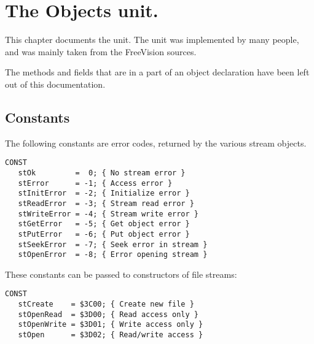 %
%
%
%
%
\chapter{The Objects unit.}
This chapter documents the  unit. The unit was implemented by
many people, and was mainly taken from the FreeVision sources.

The methods and fields that are in a  part of an object
declaration have been left out of this documentation.

\section{Constants}
The following constants are error codes, returned by the various stream
objects.

\begin{verbatim}
CONST
   stOk         =  0; { No stream error }
   stError      = -1; { Access error }
   stInitError  = -2; { Initialize error }
   stReadError  = -3; { Stream read error }
   stWriteError = -4; { Stream write error }
   stGetError   = -5; { Get object error }
   stPutError   = -6; { Put object error }
   stSeekError  = -7; { Seek error in stream }
   stOpenError  = -8; { Error opening stream }
\end{verbatim}
These constants can be passed to constructors of file streams:
\begin{verbatim}
CONST
   stCreate    = $3C00; { Create new file }
   stOpenRead  = $3D00; { Read access only }
   stOpenWrite = $3D01; { Write access only }
   stOpen      = $3D02; { Read/write access }
\end{verbatim}

